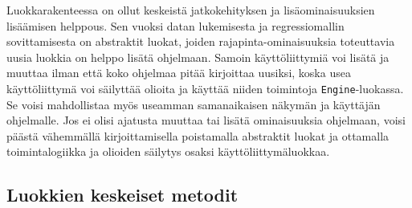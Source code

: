 \documentclass{article}
\begin{document}
    Luokkarakenteessa on ollut keskeistä jatkokehityksen ja lisäominaisuuksien lisäämisen helppous. Sen vuoksi datan lukemisesta ja regressiomallin sovittamisesta on abstraktit luokat, joiden rajapinta-ominaisuuksia toteuttavia uusia luokkia on helppo lisätä ohjelmaan. Samoin käyttöliittymiä voi lisätä ja muuttaa ilman että koko ohjelmaa pitää kirjoittaa uusiksi, koska usea käyttöliittymä voi säilyttää olioita ja käyttää niiden toimintoja \texttt{Engine}-luokassa. Se voisi mahdollistaa myös useamman samanaikaisen näkymän ja käyttäjän ohjelmalle. Jos ei olisi ajatusta muuttaa tai lisätä ominaisuuksia ohjelmaan, voisi päästä vähemmällä kirjoittamisella poistamalla abstraktit luokat ja ottamalla toimintalogiikka ja olioiden säilytys osaksi käyttöliittymäluokkaa.
    
    \subsection{Luokkien keskeiset metodit}
\end{document}

